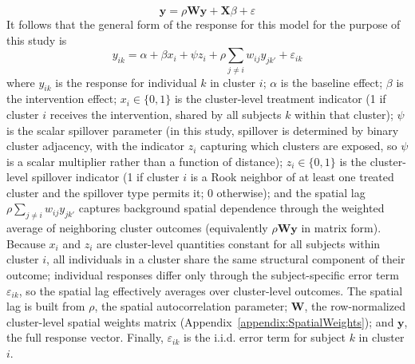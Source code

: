 \documentclass{article}[11pt]
\begin{document}
\begin{equation}
    \mathbf{y} = \rho\mathbf{Wy}+\mathbf{X}\beta + \varepsilon
\end{equation}
It follows that the general form of the response for this model for the purpose of this study is
\begin{equation}
    y_{ik} = \alpha + \beta x_i + \psi z_i + \rho\sum_{j \neq i} w_{ij} y_{jk'} + \varepsilon_{ik}
\end{equation}
where $y_{ik}$ is the response for individual $k$ in cluster $i$; $\alpha$ is the baseline effect; $\beta$ is the intervention effect; $x_i \in \{0,1\}$ is the cluster-level treatment indicator (1 if cluster $i$ receives the intervention, shared by all subjects $k$ within that cluster); $\psi$ is the scalar spillover parameter (in this study, spillover is determined by binary cluster adjacency, with the indicator $z_i$ capturing which clusters are exposed, so $\psi$ is a scalar multiplier rather than a function of distance); $z_i \in \{0,1\}$ is the cluster-level spillover indicator (1 if cluster $i$ is a Rook neighbor of at least one treated cluster and the spillover type permits it; 0 otherwise); and the spatial lag $\rho\sum_{j \neq i} w_{ij} y_{jk'}$ captures background spatial dependence through the weighted average of neighboring cluster outcomes (equivalently $\rho\mathbf{Wy}$ in matrix form). Because $x_i$ and $z_i$ are cluster-level quantities constant for all subjects within cluster $i$, all individuals in a cluster share the same structural component of their outcome; individual responses differ only through the subject-specific error term $\varepsilon_{ik}$, so the spatial lag effectively averages over cluster-level outcomes. The spatial lag is built from $\rho$, the spatial autocorrelation parameter; $\mathbf{W}$, the row-normalized cluster-level spatial weights matrix (Appendix~\ref{appendix:SpatialWeights}); and $\mathbf{y}$, the full response vector. Finally, $\varepsilon_{ik}$ is the i.i.d. error term for subject $k$ in cluster $i$.
\end{document}
